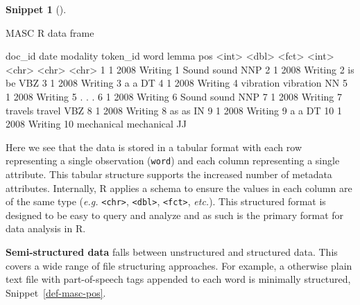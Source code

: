 \documentclass[
  letterpaper,
  krantz1]{latex/krantz-mod}
\newenvironment{Shaded}{\begin{snugshade}}{\end{snugshade}}
\newcommand{\KeywordTok}[1]{\textcolor[rgb]{0.00,0.00,0.00}{#1}}
\newcommand{\NormalTok}[1]{\textcolor[rgb]{0.00,0.00,0.00}{#1}}
\theoremstyle{definition}
\theoremstyle{definition}
\newtheorem{definition}{Snippet}[chapter]
\theoremstyle{remark}
\begin{document}
\begin{definition}[]\protect\hypertarget{def-masc-df}{}\label{def-masc-df}

MASC R data frame

\begin{Shaded}
\begin{Highlighting}[]
\NormalTok{   doc\_id  date modality token\_id word       lemma      pos}
\NormalTok{    \textless{}}\KeywordTok{int}\NormalTok{\textgreater{} \textless{}}\KeywordTok{dbl}\NormalTok{\textgreater{} \textless{}}\KeywordTok{fct}\NormalTok{\textgreater{}       \textless{}}\KeywordTok{int}\NormalTok{\textgreater{} \textless{}}\KeywordTok{chr}\NormalTok{\textgreater{}      \textless{}}\KeywordTok{chr}\NormalTok{\textgreater{}      \textless{}}\KeywordTok{chr}\NormalTok{\textgreater{}}
\NormalTok{ 1      1  2008 Writing         1 Sound      sound      NNP}
\NormalTok{ 2      1  2008 Writing         2 is         be         VBZ}
\NormalTok{ 3      1  2008 Writing         3 a          a          DT}
\NormalTok{ 4      1  2008 Writing         4 vibration  vibration  NN}
\NormalTok{ 5      1  2008 Writing         5 .          .          .}
\NormalTok{ 6      1  2008 Writing         6 Sound      sound      NNP}
\NormalTok{ 7      1  2008 Writing         7 travels    travel     VBZ}
\NormalTok{ 8      1  2008 Writing         8 as         as         IN}
\NormalTok{ 9      1  2008 Writing         9 a          a          DT}
\NormalTok{10      1  2008 Writing        10 mechanical mechanical JJ}
\end{Highlighting}
\end{Shaded}

\end{definition}

Here we see that the data is stored in a tabular format with each row
representing a single observation (\texttt{word}) and each column
representing a single attribute. This tabular structure supports the
increased number of metadata attributes. Internally, R applies a schema
to ensure the values in each column are of the same type (\emph{e.g.}
\texttt{\textless{}chr\textgreater{}},
\texttt{\textless{}dbl\textgreater{}},
\texttt{\textless{}fct\textgreater{}}, \emph{etc.}). This structured
format is designed to be easy to query and analyze and as such is the
primary format for data analysis in R.

\textbf{Semi-structured data} falls between unstructured and structured
data. This covers a wide range of file structuring approaches. For
example, a otherwise plain text file with part-of-speech tags appended
to each word is minimally structured, Snippet~\ref{def-masc-pos}.
\end{document}
